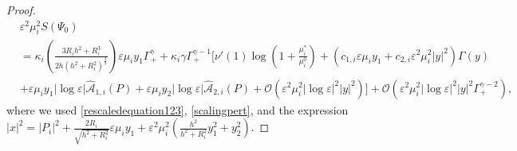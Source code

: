 \documentclass[11pt,reqno,a4paper]{amsart}
\numberwithin{equation}{section}
\newcommand{\ve}{\varepsilon}
\begin{document}
\begin{proof}
\begin{equation*}
\begin{aligned}
   &\ve^2\mu_i^2 S\left(\Psi_{0}\right)\\
   &= \kappa_i\left(\frac{3R_ih^2+R_i^3}{2h\left(h^2+R_i^2\right)^{\frac3 2}}\right)\ve\mu_i y_1\Gamma^{\gamma}_{+} +\kappa_i\gamma\Gamma^{\gamma-1}_{+}\Bigg[\nu'(1)\log\left(1+\frac{\mu^{*}_i}{\mu^{0}_i}\right)+\left(c_{1,i}\ve\mu_iy_1+c_{2,i}\ve^2\mu_i^2|y|^2\right)\Gamma(y)\\
   &+\ve\mu_i y_1|\log\ve|\widehat{\mathcal{A}}_{1,i}(P)+\ve\mu_i y_2|\log\ve|\widehat{\mathcal{A}}_{2,i}(P)+\mathcal{O}\left(\ve^2\mu_i^2|\log\ve|^2 |y|^2\right)\Bigg]+\mathcal{O}\left(\ve^2\mu_i^2|\log\ve|^2|y|^2\Gamma^{\gamma-2}_{+}\right),
    \end{aligned}
\end{equation*}
where we used \eqref{rescaledequation123}, \eqref{scalingpert}, and the expression $|x|^2=|P_i|^2+\frac{2R_i}{\sqrt{h^2+R_i^2}}\ve\mu_i y_1 +\ve^2\mu_i^2\left( \frac{h^2}{h^2+R_i^2}y_1^2 +y_2^2\right).$


\end{proof}
\end{document}
